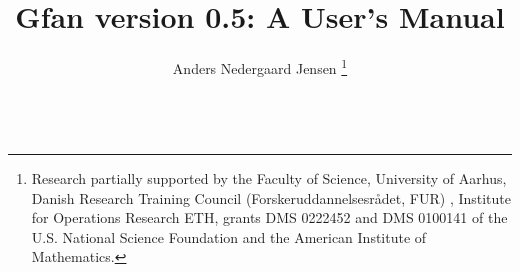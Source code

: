 

\def\name{Gfan }
\def\nameversion{gfan0.5}
\def\exename{gfan}




\title{\name version 0.5: A User's Manual}
\author{Anders Nedergaard Jensen
\thanks{Research partially supported by the Faculty of Science, University of Aarhus, Danish Research Training Council (Forskeruddannelsesr\aa det, FUR) , Institute for Operations Research ETH, grants DMS 0222452 and DMS 0100141 of the U.S. National Science Foundation and the American Institute of Mathematics.
}
\\
\\
}
\maketitle

